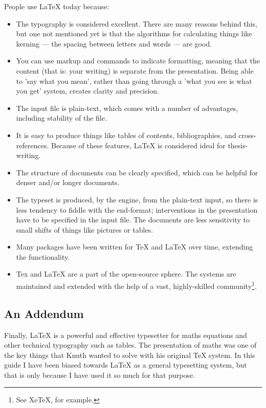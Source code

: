 \documentclass[11pt, oneside]{memoir}
\begin{document}
People use LaTeX today because:
\begin{itemize}
    \item The typography is considered excellent. There are many reasons behind this, but one not mentioned yet is that the algorithms for calculating things like kerning — the spacing between letters and words — are good.
    \item You can use markup and commands to indicate formatting, meaning that the content (that is: your writing) is separate from the presentation. Being able to 'say what you mean', rather than going through a 'what you see is what you get' system, creates clarity and precision.
    \item The input file is plain-text, which comes with a number of advantages, including stability of the file. 
    \item It is easy to produce things like tables of contents, bibliographies, and cross-references. Because of these features, LaTeX is considered ideal for thesis-writing.
    \item The structure of documents can be clearly specified, which can be helpful for denser and/or longer documents.
    \item The typeset is produced, by the engine, from the plain-text input, so there is less tendency to fiddle with the end-format; interventions in the presentation have to be specified in the input file. The documents are less sensitivity to small shifts of things like pictures or tables.
    \item Many packages have been written for TeX and LaTeX over time, extending the functionality.
    \item Tex and LaTeX are a part of the open-source sphere. The systems are maintained and extended with the help of a vast, highly-skilled community\footnote{See XeTeX, for example.}.
\end{itemize}

\subsection{An Addendum}
Finally, LaTeX is a powerful and effective typesetter for maths equations and other technical typography such as tables. The presentation of maths was one of the key things that Knuth wanted to solve with his original TeX system. In this guide I have been biased towards LaTeX as a general typesetting system, but that is only because I have used it so much for that purpose.
\end{document}
